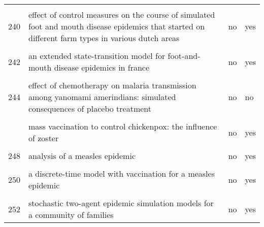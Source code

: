 \documentclass[
]{article}
\begin{document}
\begin{landscape}
\begin{longtable}{l>{\raggedright\arraybackslash}p{4cm}l>{\raggedright\arraybackslash}p{4cm}}
\cellcolor{gray!6}{239} & \cellcolor{gray!6}{a decision-tree to optimise control measures during the early stage of a foot-and-mouth disease epidemic} & \cellcolor{gray!6}{no} & \cellcolor{gray!6}{yes}\\
240 & effect of control measures on the course of simulated foot and mouth disease epidemics that started on different farm types in various dutch areas & no & yes\\
\addlinespace
\cellcolor{gray!6}{241} & \cellcolor{gray!6}{dynamics of the 2001 uk foot and mouth epidemic: stochastic dispersal in a heterogeneous landscape} & \cellcolor{gray!6}{no} & \cellcolor{gray!6}{yes}\\
242 & an extended state-transition model for foot-and-mouth disease epidemics in france & no & yes\\
\cellcolor{gray!6}{243} & \cellcolor{gray!6}{simulated economic consequences of foot-and-mouth disease epidemics and their public control in france} & \cellcolor{gray!6}{no} & \cellcolor{gray!6}{no}\\
244 & effect of chemotherapy on malaria transmission among yanomami amerindians: simulated consequences of placebo treatment & no & no\\
\cellcolor{gray!6}{245} & \cellcolor{gray!6}{modelling vaccination strategy against directly transmitted diseases using a series of pulses} & \cellcolor{gray!6}{no} & \cellcolor{gray!6}{yes}\\
\addlinespace
246 & mass vaccination to control chickenpox: the influence of zoster & no & yes\\
\cellcolor{gray!6}{247} & \cellcolor{gray!6}{an evaluation of alternate control strategies for foot-and-mouth disease in australia: a regional approach} & \cellcolor{gray!6}{no} & \cellcolor{gray!6}{yes}\\
248 & analysis of a measles epidemic & no & yes\\
\cellcolor{gray!6}{249} & \cellcolor{gray!6}{a model of the transmission of dengue fever with an evaluation of the impact of ultra-low volume (ulv) insecticide applications on dengue epidemics} & \cellcolor{gray!6}{no} & \cellcolor{gray!6}{no}\\
250 & a discrete-time model with vaccination for a measles epidemic & no & yes\\
\addlinespace
\cellcolor{gray!6}{251} & \cellcolor{gray!6}{a stochastic model of epidemics in military recruits} & \cellcolor{gray!6}{no} & \cellcolor{gray!6}{no}\\
252 & stochastic two-agent epidemic simulation models for a community of families & no & yes\\*
\end{longtable}
\endgroup{}
\end{landscape}
\end{document}
